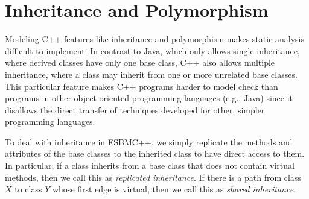 \documentclass[a4paper]{llncs}
\newcommand{\comment}[1]{}
\begin{document}
\comment{
We have elaborated a hierarchical structure for the
input/output (I/O) stream library that is similar to the actual
one (as described in~\cite{CppReference12}). However,
in our I/O stream operational model, the input operator $>>$
is simply modeled as a non-deterministic variable and we do not check
any related safety property. Similarly, the output operator $<<$ does not
present any constraints or properties to be checked since
we do not check whether a given value has been printed on the screen
(ESBMC++ is only interested in checking the properties related to
software and not that of hardware).}




\section{Inheritance and Polymorphism}
\label{inheritance-and-polymorphism}

Modeling C++ features like inheritance and polymorphism
makes static analysis difficult to implement.
In contrast to Java, which only allows single inheritance, where derived classes
have only one base class, C++ also allows multiple inheritance, where a class
may inherit from one or more unrelated base classes. This particular feature
makes C++ programs harder to model check than programs in other object-oriented
programming languages (e.g., Java) since it disallows the direct transfer of
techniques developed for other, simpler programming languages.

To deal with inheritance in ESBMC++, we simply replicate the methods
and attributes of the base classes to the inherited class to have
direct access to them. In particular, if a class inherits from
a base class that does not contain virtual methods,
then we call this as \textit{replicated inheritance}. If there is a path from
class $\mathit{X}$ to class $\mathit{Y}$ whose first edge is virtual, then
we call this as \textit{shared inheritance}.
\end{document}
